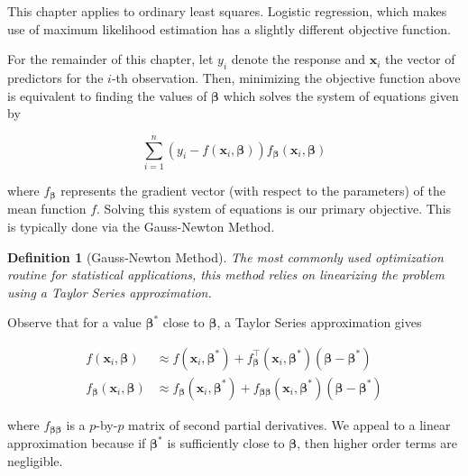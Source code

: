 \documentclass[
]{book}
\theoremstyle{plain}
\theoremstyle{mydefn}
\newtheorem{definition}{Definition}[chapter]
\theoremstyle{myexmpl}
\theoremstyle{remark}
\begin{document}
\begin{rmdwarning}
This chapter applies to ordinary least squares. Logistic regression, which makes use of maximum likelihood estimation has a slightly different objective function.\\
\end{rmdwarning}

For the remainder of this chapter, let \(y_i\) denote the response and \(\mathbf{x}_i\) the vector of predictors for the \(i\)-th observation. Then, minimizing the objective function above is equivalent to finding the values of \(\boldsymbol{\beta}\) which solves the system of equations given by

\[\sum_{i=1}^{n} \left(y_i - f\left(\mathbf{x}_i, \boldsymbol{\beta}\right)\right) f_{\boldsymbol{\beta}}\left(\mathbf{x}_i, \boldsymbol{\beta}\right)\]

where \(f_{\boldsymbol{\beta}}\) represents the gradient vector (with respect to the parameters) of the mean function \(f\). Solving this system of equations is our primary objective. This is typically done via the Gauss-Newton Method.

\begin{definition}[Gauss-Newton Method]
The most commonly used optimization routine for statistical applications, this method relies on linearizing the problem using a Taylor Series approximation.
\end{definition}

Observe that for a value \(\boldsymbol{\beta}^*\) close to \(\boldsymbol{\beta}\), a Taylor Series approximation gives

\[
\begin{aligned}
  f\left(\mathbf{x}_i,\boldsymbol{\beta}\right)
    &\approx f\left(\mathbf{x}_i,\boldsymbol{\beta}^*\right) + f^\top_{\boldsymbol{\beta}}\left(\mathbf{x}_i,\boldsymbol{\beta}^*\right)\left(\boldsymbol{\beta} - \boldsymbol{\beta}^*\right) \\
  f_{\boldsymbol{\beta}}\left(\mathbf{x}_i,\boldsymbol{\beta}\right)
    &\approx f_{\boldsymbol{\beta}}\left(\mathbf{x}_i,\boldsymbol{\beta}^*\right) + f_{\boldsymbol{\beta}\boldsymbol{\beta}}\left(\mathbf{x}_i,\boldsymbol{\beta}^*\right)\left(\boldsymbol{\beta} - \boldsymbol{\beta}^*\right)
\end{aligned}
\]

where \(f_{\boldsymbol{\beta}\boldsymbol{\beta}}\) is a \(p\)-by-\(p\) matrix of second partial derivatives. We appeal to a linear approximation because if \(\boldsymbol{\beta}^*\) is sufficiently close to \(\boldsymbol{\beta}\), then higher order terms are negligible.
\end{document}
